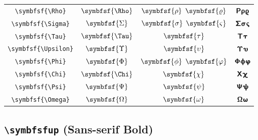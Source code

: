 \documentclass[12pt,a4paper]{article}
\begin{document}
\begin{longtable}{|c|c|c|c|}
\verb|\symbfsf{\Rho}| & $\symbfsf{\Rho}$ & $\symbfsf{\rho}$ $\symbfsf{\varrho}$ & $ 𝝦 𝞀 𝞎 $ \\
\verb|\symbfsf{\Sigma}| & $\symbfsf{\Sigma}$ & $\symbfsf{\sigma}$ $\symbfsf{\varsigma}$ & $ 𝝨 𝞂 𝞁 $ \\
\verb|\symbfsf{\Tau}| & $\symbfsf{\Tau}$ & $\symbfsf{\tau}$ & $ 𝝩 𝞃 $ \\
\verb|\symbfsf{\Upsilon}| & $\symbfsf{\Upsilon}$ & $\symbfsf{\upsilon}$ & $ 𝝪 𝞄 $ \\
\verb|\symbfsf{\Phi}| & $\symbfsf{\Phi}$ & $\symbfsf{\phi}$ $\symbfsf{\varphi}$ & $ 𝝫 𝞍 𝞅 $ \\
\verb|\symbfsf{\Chi}| & $\symbfsf{\Chi}$ & $\symbfsf{\chi}$ & $ 𝝬 𝞆 $ \\
\verb|\symbfsf{\Psi}| & $\symbfsf{\Psi}$ & $\symbfsf{\psi}$ & $ 𝝭 𝞇 $ \\
\verb|\symbfsf{\Omega}| & $\symbfsf{\Omega}$ & $\symbfsf{\omega}$ & $ 𝝮 𝞈 $ \\
\hline
\end{longtable}

\newpage

\subsection*{\texttt{\textbackslash{}symbfsfup} (Sans-serif Bold)}
\end{document}
